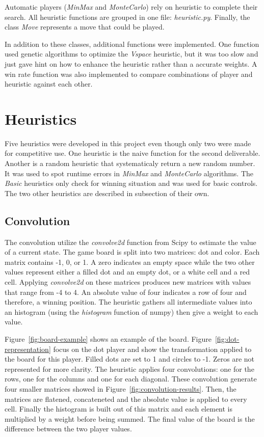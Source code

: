 \documentclass[runningheads]{llncs}
\begin{document}
Automatic players (\textit{MinMax} and
\textit{MonteCarlo}) rely on heuristic to complete
their search. All heuristic functions are grouped
in one file: \textit{heuristic.py}.
Finally, the class \textit{Move} represents a move
that could be played.

In addition to these classes, additional functions
were implemented. One function used genetic
algorithms to optimize the \textit{Vspace}
heuristic, but it was too slow and just gave hint
on how to enhance the heuristic rather than a
accurate weights.  A win rate function was also
implemented to compare combinations of player and
heuristic against each other.

\section{Heuristics}
Five heuristics were developed in this project
even though only two were made for competitive
use. One heuristic is the naive function for the
second deliverable. Another is a random heuristic
that systematicaly return a new random number. It
was used to spot runtime errors in \textit{MinMax} and
\textit{MonteCarlo} algorithms. The \textit{Basic}
heuristics only check for winning situation and
was used for basic controls.
The two other heuristics are described in
subsection of their own.

\subsection{Convolution}
The convolution utilize the \textit{convolve2d} function
from Scipy to estimate the value of a current
state.
The game board is split into two matrices: dot and
color. Each matrix contains -1, 0, or 1. A zero
indicates an empty space while the two other values
represent either a filled dot and an empty dot, or
a white cell and a red cell.
Applying \textit{convolve2d} on these matrices
produces new matrices with values that range from
-4 to 4. An absolute value of four indicates a row
of four and therefore, a winning position.
The heuristic gathers all intermediate values into
an histogram (using the \textit{histogram}
function of numpy) then give a weight to each
value.

Figure~\ref{fig:board-example} shows an example of
the board. Figure~\ref{fig:dot-representation}
focus on the dot player and show the
transformation applied to the board for this
player. Filled dots are set to 1 and circles to
-1. Zeros are not represented for more clarity.
The heuristic applies four convolutions: one for
the rows, one for the columns and one for each
diagonal. These convolution generate four smaller
matrices showed in
Figure~\ref{fig:convolution-results}.  Then, the
matrices are flatened, concateneted and the
absolute value is applied to every cell. Finally
the histogram is built out of this matrix and each
element is multiplied by a weight before being
summed.  The final
value of the board is the difference between the
two player values.
\end{document}
